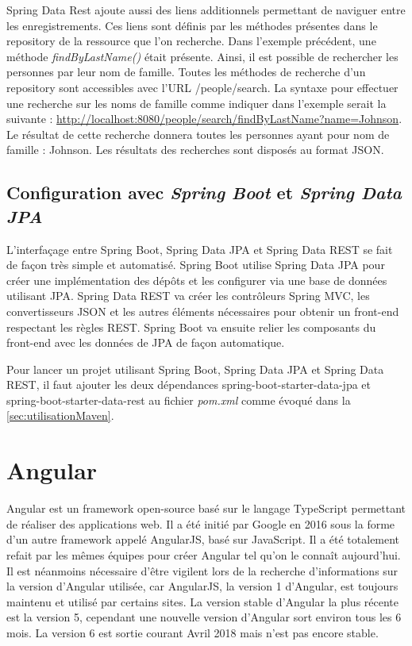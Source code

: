 \documentclass{polytech/polytech}
\begin{document}
Spring Data Rest ajoute aussi des liens additionnels permettant de naviguer entre les enregistrements. Ces liens sont définis par les méthodes présentes dans le repository de la ressource que l’on recherche. Dans l’exemple précédent, une méthode \textit{findByLastName()} était présente. Ainsi, il est possible de rechercher les personnes par leur nom de famille. Toutes les méthodes de recherche d’un repository sont accessibles avec l’URL /people/search. La syntaxe pour effectuer une recherche sur les noms de famille comme indiquer dans l’exemple serait la suivante : \url{http://localhost:8080/people/search/findByLastName?name=Johnson}. Le résultat de cette recherche donnera toutes les personnes ayant pour nom de famille : Johnson. Les résultats des recherches sont disposés au format JSON. 

\section{Configuration avec \textit{Spring Boot} et \textit{Spring Data JPA}}

L’interfaçage entre Spring Boot, Spring Data JPA et Spring Data REST se fait de façon très simple et automatisé. Spring Boot utilise Spring Data JPA pour créer une implémentation des dépôts et les configurer via une base de données utilisant JPA. Spring Data REST va créer les contrôleurs Spring MVC, les convertisseurs JSON et les autres éléments nécessaires pour obtenir un front-end respectant les règles REST. Spring Boot va ensuite relier les composants du front-end avec les données de JPA de façon automatique. 

Pour lancer un projet utilisant Spring Boot, Spring Data JPA et Spring Data REST, il faut ajouter les deux dépendances spring-boot-starter-data-jpa et spring-boot-starter-data-rest au fichier \textit{pom.xml} comme évoqué dans la \autoref{sec:utilisationMaven}.


\chapter{Angular}

Angular est un framework open-source basé sur le langage TypeScript permettant de réaliser des applications web. Il a été initié par Google en 2016 sous la forme d’un autre framework appelé AngularJS, basé sur JavaScript. Il a été totalement refait par les mêmes équipes pour créer Angular tel qu’on le connaît aujourd’hui. Il est néanmoins nécessaire d’être vigilent lors de la recherche d’informations sur la version d’Angular utilisée, car AngularJS, la version 1 d’Angular, est toujours maintenu et utilisé par certains sites. La version stable d’Angular la plus récente est la version 5, cependant une nouvelle version d’Angular sort environ tous les 6 mois. La version 6 est sortie courant Avril 2018 mais n’est pas encore stable.
\end{document}
